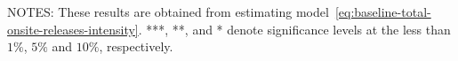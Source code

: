 \begin{table}[H]
{\begin{tabular}{@{}lllllllllllll@{}}
        \end{tabular}%
    }
    \begin{minipage}{\columnwidth}
        \vspace{0.05in}
        \tiny NOTES: These results are obtained from estimating model~\ref{eq:baseline-total-onsite-releases-intensity}. ***, **, and * denote significance levels at the less than $1\%$, $5\%$ and $10\%$, respectively.
    \end{minipage}
\end{table}